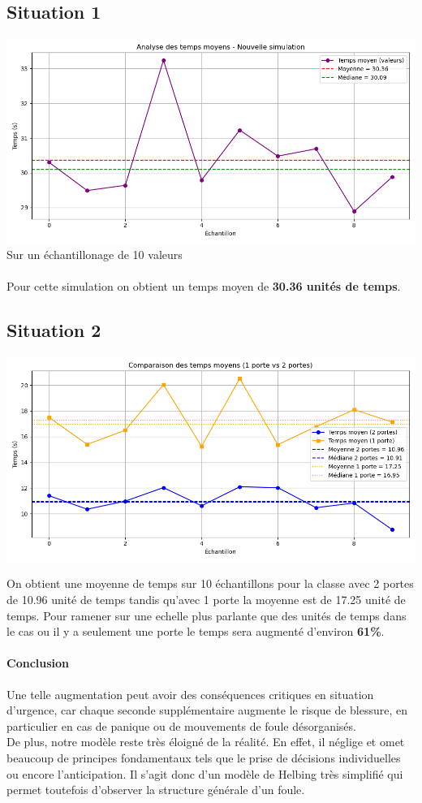 \documentclass[a4paper,12pt]{article}
\begin{document}
\subsection{Situation 1}

\includegraphics[width=\textwidth]{resultat.png} %
Sur un échantillonage de 10 valeurs
\\
\\
Pour cette simulation on obtient un temps moyen de \textbf{30.36 unités de temps}.
\subsection{Situation 2}


\includegraphics[width=\textwidth]{resultat_2.png} %

On obtient une moyenne de temps sur 10 échantillons pour la classe avec 2 portes de 10.96 unité de temps tandis qu'avec 1 porte la moyenne est de 17.25 unité de temps. Pour ramener sur une echelle plus parlante que des unités de temps dans le cas ou il y a seulement une porte le temps sera augmenté d'environ \textbf{61\%}. 
\paragraph{Conclusion} Une telle augmentation peut avoir des conséquences critiques en situation d'urgence, car chaque seconde supplémentaire augmente le risque de blessure, en particulier en cas de panique ou de mouvements de foule désorganisés. \\ \indent De plus, notre modèle reste très éloigné de la réalité. En effet, il néglige et omet beaucoup de principes fondamentaux tels que le prise de décisions individuelles ou encore l'anticipation. Il s'agit donc d'un modèle de Helbing très simplifié qui permet toutefois d'observer la structure générale d'un foule.
\end{document}
